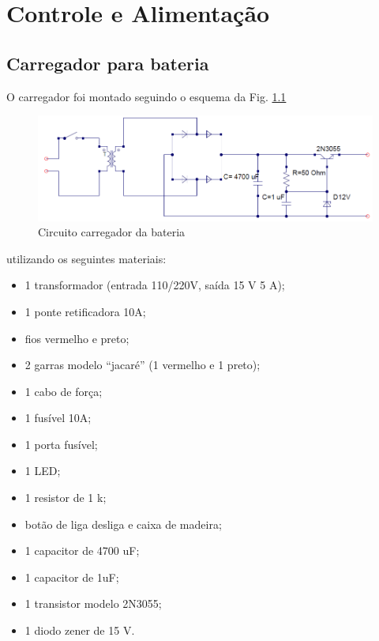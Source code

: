 \chapter{Controle e Alimentação}
\label{chapter:movimentacao}

\section{Carregador para bateria}

O carregador foi montado seguindo o esquema da Fig. \ref{fig:circuito_carregador.png}

\begin{figure}
    \begin{center}
        \includegraphics{figuras/circuito_carregador.png}
    \end{center}
    \caption{Circuito carregador da bateria}
    \label{fig:circuito_carregador.png}
\end{figure}

utilizando os seguintes materiais:

\begin{itemize}
    \item 1 transformador (entrada 110/220V, saída 15 V 5 A);
    \item 1 ponte retificadora 10A;
    \item fios vermelho e preto;
    \item 2 garras modelo “jacaré” (1 vermelho e 1 preto);
    \item 1 cabo de força;
    \item 1 fusível 10A;
    \item 1 porta fusível;
    \item 1 LED;
    \item 1 resistor de 1 k;
    \item botão de liga desliga e caixa de madeira;
    \item 1 capacitor de 4700 uF;
    \item 1 capacitor de 1uF;
    \item 1 transistor modelo 2N3055;
    \item 1 diodo zener de 15 V.
\end{itemize}

